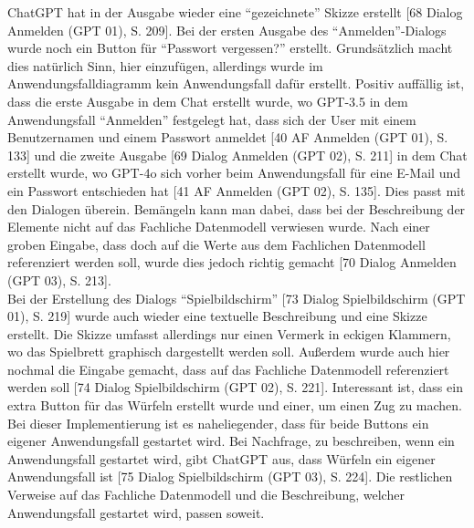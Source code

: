 ChatGPT hat in der Ausgabe wieder eine ``gezeichnete'' Skizze erstellt [68 Dialog Anmelden (GPT 01), S. 209]. Bei der ersten Ausgabe des ``Anmelden''-Dialogs wurde noch ein Button 
für ``Passwort vergessen?'' erstellt. Grundsätzlich macht dies natürlich Sinn, hier einzufügen, allerdings wurde im Anwendungsfalldiagramm 
kein Anwendungsfall dafür erstellt. Positiv auffällig ist, dass die erste Ausgabe in dem Chat erstellt wurde, wo GPT-3.5 
in dem Anwendungsfall ``Anmelden'' festgelegt hat, dass sich der User mit einem Benutzernamen und einem Passwort anmeldet [40 AF Anmelden (GPT 01), S. 133] 
und die zweite Ausgabe [69 Dialog Anmelden (GPT 02), S. 211] in dem Chat erstellt wurde, wo GPT-4o sich vorher beim Anwendungsfall für eine E-Mail und ein 
Passwort entschieden hat [41 AF Anmelden (GPT 02), S. 135]. Dies passt mit den Dialogen überein. Bemängeln kann man dabei, dass bei der Beschreibung der Elemente nicht auf 
das Fachliche Datenmodell verwiesen wurde. Nach einer groben Eingabe, dass doch auf die Werte aus dem Fachlichen Datenmodell referenziert 
werden soll, wurde dies jedoch richtig gemacht [70 Dialog Anmelden (GPT 03), S. 213].\\
Bei der Erstellung des Dialogs ``Spielbildschirm'' [73 Dialog Spielbildschirm (GPT 01), S. 219] wurde auch wieder eine textuelle Beschreibung und eine Skizze erstellt. Die Skizze umfasst 
allerdings nur einen Vermerk in eckigen Klammern, wo das Spielbrett graphisch dargestellt werden soll. Außerdem wurde auch hier nochmal die 
Eingabe gemacht, dass auf das Fachliche Datenmodell referenziert werden soll [74 Dialog Spielbildschirm (GPT 02), S. 221]. Interessant ist, dass ein extra Button für das Würfeln erstellt 
wurde und einer, um einen Zug zu machen. Bei dieser Implementierung ist es naheliegender, dass für beide Buttons ein eigener Anwendungsfall 
gestartet wird. Bei Nachfrage, zu beschreiben, wenn ein Anwendungsfall gestartet wird, gibt ChatGPT aus, dass Würfeln ein eigener 
Anwendungsfall ist [75 Dialog Spielbildschirm (GPT 03), S. 224]. Die restlichen Verweise auf das Fachliche Datenmodell und die Beschreibung, welcher Anwendungsfall gestartet wird, 
passen soweit.

